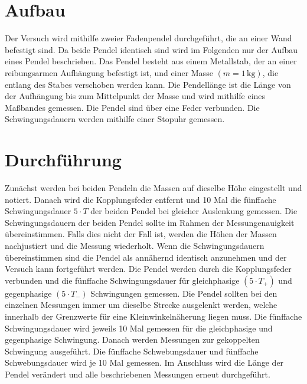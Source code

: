 \section{Aufbau}
\label{sec:Aufbau}
Der Versuch wird mithilfe zweier Fadenpendel durchgeführt, die an einer Wand befestigt sind. Da beide Pendel identisch sind wird im Folgenden 
nur der Aufbau eines Pendel beschrieben. 
Das Pendel besteht aus einem Metallstab, der an einer reibungsarmen Aufhängung befestigt ist, und einer Masse $(m = 1 \,\unit{\kilo\gram})$, 
die entlang des Stabes verschoben werden kann. Die Pendellänge ist die Länge von der Aufhängung bis zum Mittelpunkt der Masse und wird mithilfe eines 
Maßbandes gemessen.
Die Pendel sind über eine Feder verbunden. Die Schwingungsdauern werden mithilfe einer Stopuhr gemessen. 

\section{Durchführung}
\label{sec:Durchführung}
Zunächst werden bei beiden Pendeln die Massen auf dieselbe Höhe eingestellt und notiert.
Danach wird die Kopplungsfeder entfernt und 10 Mal die fünffache Schwingungsdauer $5 \cdot T$ der beiden Pendel bei gleicher Auslenkung gemessen. Die Schwingungsdauern der beiden Pendel sollte im
Rahmen der Messungenauigkeit übereinstimmen. Falls dies nicht der Fall ist, werden die Höhen der Massen nachjustiert und die Messung wiederholt.
Wenn die Schwingungsdauern übereinstimmen sind die Pendel als annähernd identisch anzunehmen und der Versuch kann fortgeführt werden. 
Die Pendel werden durch die Kopplungsfeder verbunden und die fünffache Schwingungsdauer für gleichphasige $(5 \cdot T_+)$ und gegenphasige $(5 \cdot T_-)$ 
Schwingungen gemessen. 
Die Pendel sollten bei den einzelnen Messungen immer um dieselbe Strecke ausgelenkt werden, welche innerhalb der Grenzwerte für eine Kleinwinkelnäherung
liegen muss. Die fünffache Schwingungsdauer wird jeweils 10 Mal gemessen für die gleichphasige und gegenphasige Schwingung. 
Danach werden Messungen zur gekoppelten Schwingung ausgeführt. Die fünffache Schwebungsdauer und fünffache Schwebungsdauer wird je 10 Mal gemessen. 
Im Anschluss wird die Länge der Pendel verändert und alle beschriebenen Messungen erneut durchgeführt. 

